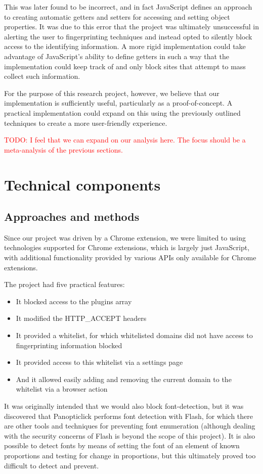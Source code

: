 \documentclass[12pt,a4paper]{article}
\begin{document}
This was later found to be incorrect, and in fact JavaScript defines an approach to creating automatic getters and setters for accessing and setting object properties. It was due to this error that the project was ultimately unsuccessful in alerting the user to fingerprinting techniques and instead opted to silently block access to the identifying information. A more rigid implementation could take advantage of JavaScript's ability to define getters in such a way that the implementation could keep track of and only block sites that attempt to mass collect such information.

For the purpose of this research project, however, we believe that our implementation is sufficiently useful, particularly as a proof-of-concept. A practical implementation could expand on this using the previously outlined techniques to create a more user-friendly experience.

\textcolor{red}{TODO: I feel that we can expand on our analysis here. The focus should be a meta-analysis of the previous sections.}

\section{Technical components}
\subsection{Approaches and methods}
Since our project was driven by a Chrome extension, we were limited to using technologies supported for Chrome extensions, which is largely just JavaScript, with additional functionality provided by various APIs only available for Chrome extensions.

The project had five practical features:
\begin{itemize}
	\item It blocked access to the plugins array
	\item It modified the HTTP\_ACCEPT headers
	\item It provided a whitelist, for which whitelisted domains did not have access to fingerprinting information blocked
	\item It provided access to this whitelist via a settings page
	\item And it allowed easily adding and removing the current domain to the whitelist via a browser action
\end{itemize}

It was originally intended that we would also block font-detection, but it was discovered that Panopticlick performs font detection with Flash, for which there are other tools and techniques for preventing font enumeration (although dealing with the security concerns of Flash is beyond the scope of this project). It is also possible to detect fonts by means of setting the font of an element of known proportions and testing for change in proportions, but this ultimately proved too difficult to detect and prevent.
\end{document}
